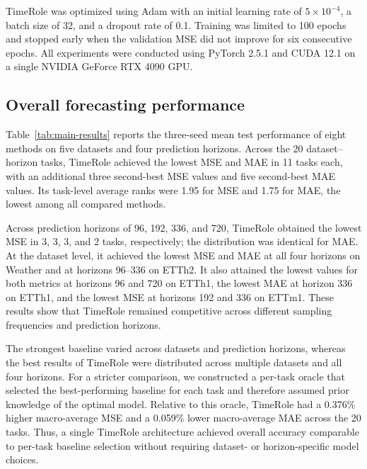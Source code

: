 TimeRole was optimized using Adam with an initial learning rate of \(5\times10^{-4}\), a batch size of 32, and a dropout rate of 0.1. Training was limited to 100 epochs and stopped early when the validation MSE did not improve for six consecutive epochs. All experiments were conducted using PyTorch 2.5.1 and CUDA 12.1 on a single NVIDIA GeForce RTX 4090 GPU.

\subsection{Overall forecasting performance}

Table~\ref{tab:main-results} reports the three-seed mean test performance of eight methods on five datasets and four prediction horizons. Across the 20 dataset--horizon tasks, TimeRole achieved the lowest MSE and MAE in 11 tasks each, with an additional three second-best MSE values and five second-best MAE values. Its task-level average ranks were 1.95 for MSE and 1.75 for MAE, the lowest among all compared methods.

Across prediction horizons of 96, 192, 336, and 720, TimeRole obtained the lowest MSE in 3, 3, 3, and 2 tasks, respectively; the distribution was identical for MAE. At the dataset level, it achieved the lowest MSE and MAE at all four horizons on Weather and at horizons 96--336 on ETTh2. It also attained the lowest values for both metrics at horizons 96 and 720 on ETTh1, the lowest MAE at horizon 336 on ETTh1, and the lowest MSE at horizons 192 and 336 on ETTm1. These results show that TimeRole remained competitive across different sampling frequencies and prediction horizons.

The strongest baseline varied across datasets and prediction horizons, whereas the best results of TimeRole were distributed across multiple datasets and all four horizons. For a stricter comparison, we constructed a per-task oracle that selected the best-performing baseline for each task and therefore assumed prior knowledge of the optimal model. Relative to this oracle, TimeRole had a 0.376\% higher macro-average MSE and a 0.059\% lower macro-average MAE across the 20 tasks. Thus, a single TimeRole architecture achieved overall accuracy comparable to per-task baseline selection without requiring dataset- or horizon-specific model choices.

